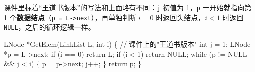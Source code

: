 \documentclass[10.5pt,a4paper,oneside]{article}
\newenvironment{Shaded}{}{}
\newcommand{\CommentTok}[1]{\textcolor[rgb]{0.18,0.55,0.23}{#1}}
\newcommand{\ControlFlowTok}[1]{\textcolor[rgb]{0.12,0.31,0.71}{#1}}
\newcommand{\DataTypeTok}[1]{\textcolor[rgb]{0.12,0.31,0.71}{#1}}
\newcommand{\DecValTok}[1]{\textcolor[rgb]{0.77,0.35,0.07}{#1}}
\newcommand{\NormalTok}[1]{#1}
\newcommand{\OperatorTok}[1]{\textcolor[rgb]{0.20,0.20,0.20}{#1}}
\begin{document}
\begin{bookbox}

课件里标着“王道书版本”的写法和上面略有不同：\texttt{j} 初值为
1，\texttt{p} 一开始就指向第 1
个\textbf{数据结点}（\texttt{p\ =\ L-\textgreater{}next}），再单独判断
\(i=0\) 时返回头结点，\(i<1\) 时返回 \texttt{NULL}，之后的循环逻辑一样。

\begin{Shaded}
\begin{Highlighting}[]
\NormalTok{LNode }\OperatorTok{*}\NormalTok{GetElem}\OperatorTok{(}\NormalTok{LinkList L}\OperatorTok{,} \DataTypeTok{int}\NormalTok{ i}\OperatorTok{)} \OperatorTok{\{}   \CommentTok{// 课件上的"王道书版本"}
    \DataTypeTok{int}\NormalTok{ j }\OperatorTok{=} \DecValTok{1}\OperatorTok{;}
\NormalTok{    LNode }\OperatorTok{*}\NormalTok{p }\OperatorTok{=}\NormalTok{ L}\OperatorTok{{-}\textgreater{}}\NormalTok{next}\OperatorTok{;}
    \ControlFlowTok{if} \OperatorTok{(}\NormalTok{i }\OperatorTok{==} \DecValTok{0}\OperatorTok{)}
        \ControlFlowTok{return}\NormalTok{ L}\OperatorTok{;}
    \ControlFlowTok{if} \OperatorTok{(}\NormalTok{i }\OperatorTok{\textless{}} \DecValTok{1}\OperatorTok{)}
        \ControlFlowTok{return}\NormalTok{ NULL}\OperatorTok{;}
    \ControlFlowTok{while} \OperatorTok{(}\NormalTok{p }\OperatorTok{!=}\NormalTok{ NULL }\OperatorTok{\&\&}\NormalTok{ j }\OperatorTok{\textless{}}\NormalTok{ i}\OperatorTok{)} \OperatorTok{\{}
\NormalTok{        p }\OperatorTok{=}\NormalTok{ p}\OperatorTok{{-}\textgreater{}}\NormalTok{next}\OperatorTok{;}
\NormalTok{        j}\OperatorTok{++;}
    \OperatorTok{\}}
    \ControlFlowTok{return}\NormalTok{ p}\OperatorTok{;}
\OperatorTok{\}}
\end{Highlighting}
\end{Shaded}

\end{bookbox}
\end{document}

